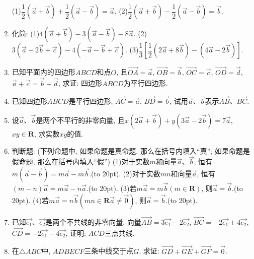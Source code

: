 \documentclass[10pt,a4paper]{article}
\newcommand{\bracket}[1]{(\hbox to #1pt{})}
\begin{document}
\begin{enumerate}[1.]
(1)$\dfrac 12(\overrightarrow a+\overrightarrow b)+\dfrac 12(\overrightarrow a-\overrightarrow b)=\overrightarrow a$. (2)$\dfrac 12(\overrightarrow a+\overrightarrow b)-\dfrac 12(\overrightarrow a-\overrightarrow b)=\overrightarrow b$.
\item 化简:
(1)$4(\overrightarrow a+\overrightarrow b)-3(\overrightarrow a-\overrightarrow b)-8\overrightarrow a$. (2)$3(\overrightarrow a-2\overrightarrow b+\overrightarrow c)-4(-\overrightarrow a-\overrightarrow b+\overrightarrow c)$.
(3)$\dfrac 13[\dfrac 12(2\overrightarrow a+8\overrightarrow b)-(4\overrightarrow a-2\overrightarrow b)]$.
\item 已知平面内的四边形$ABCD$和点$O$, 且$\overrightarrow{OA}=\overrightarrow a$, $\overrightarrow{OB}=\overrightarrow b$, $\overrightarrow{OC}=\overrightarrow c$, $\overrightarrow{OD}=\overrightarrow d$, $\overrightarrow a+\overrightarrow c=\overrightarrow b+\overrightarrow d$, 求证: 四边形$ABCD$为平行四边形.
\item 已知四边形$ABCD$是平行四边形, $\overrightarrow{AC}=\overrightarrow a$, $\overrightarrow{BD}=\overrightarrow b$, 试用$\overrightarrow a$、$\overrightarrow b$表示$\overrightarrow{AB}$、$\overrightarrow{BC}$.
\item 设$\overrightarrow a$、$\overrightarrow b$是两个不平行的非零向量, 且$x(2\overrightarrow a+\overrightarrow b)+y(3\overrightarrow a-2\overrightarrow b)=7\overrightarrow a$, $xy\in \mathbf{R}$, 求实数$xy$的值.
\item 判断题: (下列命题中, 如果命题是真命题, 那么在括号内填入``真''; 如果命题是假命题, 那么在括号内填入``假'')
(1)对于实数$m$和向量$\overrightarrow a$、$\overrightarrow b$, 恒有$m(\overrightarrow a-\overrightarrow b)=m\overrightarrow a-m\overrightarrow b$.\bracket{20}.
(2)对于实数$mn$和向量$\overrightarrow a$, 恒有$(m-n)\overrightarrow a=m\overrightarrow a-n\overrightarrow a$.\bracket{20}.
(3)若$m\overrightarrow a=m\overrightarrow b(m\in \mathbf{R})$, 则$\overrightarrow a=\overrightarrow b$.\bracket{20}.
(4)若$m\overrightarrow a=n\overrightarrow b(mn\in \mathbf{R}\overrightarrow a\ne \overrightarrow 0)$, 则$\overrightarrow a=\overrightarrow b$.\bracket{20}.
\item 已知$\overrightarrow{e_1}$、$\overrightarrow{e_2}$是两个不共线的非零向量, 向量$\overrightarrow{AB}=3\overrightarrow{e_1}-2\overrightarrow{e_2}$, $\overrightarrow{BC}=-2\overrightarrow{e_1}+4\overrightarrow{e_2}$, $\overrightarrow{CD}=-2\overrightarrow{e_1}-4\overrightarrow{e_2}$, 证明: $ACD$三点共线.
\item 在$\triangle ABC$中, $ADBECF$三条中线交于点$G$, 求证: $\overrightarrow{GD}+\overrightarrow{GE}+\overrightarrow{GF}=\overrightarrow 0$.
    

\end{enumerate}
\end{document}
